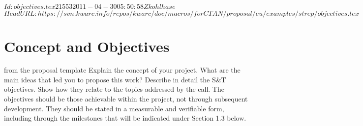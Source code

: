 \svnInfo $Id: objectives.tex 21553 2011-04-30 05:50:58Z kohlhase $
\svnKeyword $HeadURL: https://svn.kwarc.info/repos/kwarc/doc/macros/forCTAN/proposal/eu/examples/strep/objectives.tex $
\section{Concept and Objectives}\label{sec:objectives}
\begin{todo}{from the proposal template}
  Explain the concept of your project. What are the main ideas that led you to propose
  this work?  Describe in detail the S\&T objectives. Show how they relate to the topics
  addressed by the call. The objectives should be those achievable within the project, not
  through subsequent development. They should be stated in a measurable and verifiable
  form, including through the milestones that will be indicated under Section 1.3 below.
\end{todo}

